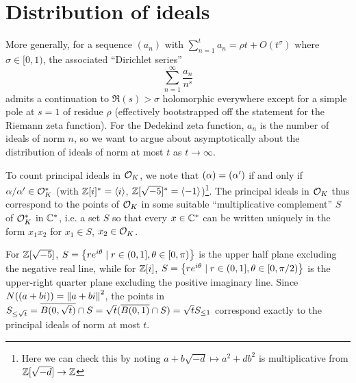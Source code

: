 \documentclass[11pt]{article}
\begin{document}
\section{Distribution of ideals}
More generally, for a sequence $(a_n)$ with $\sum_{n = 1}^t a_n = \rho t + O(t^\sigma)$ where $\sigma \in [0, 1)$, the associated ``Dirichlet series''
$$
    \sum_{n = 1}^\infty \frac{a_n}{n^s}
$$
admits a continuation to $\Re(s) > \sigma$ holomorphic everywhere except for a simple pole at $s = 1$ of residue $\rho$ (effectively bootstrapped off the statement for the Riemann zeta function). For the Dedekind zeta function, $a_n$ is the number of ideals of norm $n$, so we want to argue about asymptotically about the distribution of ideals of norm at most $t$ as $t \to \infty$.

To count principal ideals in $\mathcal{O}_K$, we note that $(\alpha) = (\alpha')$ if and only if $\alpha/\alpha' \in \mathcal{O}_K^*$ (with $\mathbb{Z}[i]^* = \left\langle i \right\rangle$, $\mathbb{Z}[\sqrt{-5}]^* = \left\langle -1 \right\rangle$)\footnote{Here we can check this by noting $a + b\sqrt{-d} \mapsto a^2 + db^2$ is multiplicative from $\mathbb{Z}[\sqrt{-d}] \to \mathbb{Z}$}. The principal ideals in $\mathcal{O}_K$ thus correspond to the points of $\mathcal{O}_K$ in some suitable ``multiplicative complement'' $S$ of $\mathcal{O}_K^*$ in $\mathbb{C}^*$, i.e. a set $S$ so that every $x \in \mathbb{C}^*$ can be written uniquely in the form $x_1x_2$ for $x_1 \in S$, $x_2 \in \mathcal{O}_K$. 

For $\mathbb{Z}[\sqrt{-5}]$, $S = \left\{  re^{i\theta} \mid r \in (0, 1], \theta \in [0, \pi)  \right\}$ is the upper half plane excluding the negative real line, while for $\mathbb{Z}[i]$, $S = \left\{  re^{i\theta} \mid r \in (0, 1], \theta \in [0, \pi/2)  \right\}$ is the upper-right quarter plane excluding the positive imaginary line. Since $N(\left(  a + bi  \right)) = \left\| a + bi \right\|^2$, the points in $S_{\leq \sqrt{t}} = \overline{B(0, \sqrt{t})} \cap S = \sqrt{t}(\overline{B(0, 1)} \cap S) = \sqrt{t}S_{\leq 1}$ correspond exactly to the principal ideals of norm at most $t$. 
\end{document}
